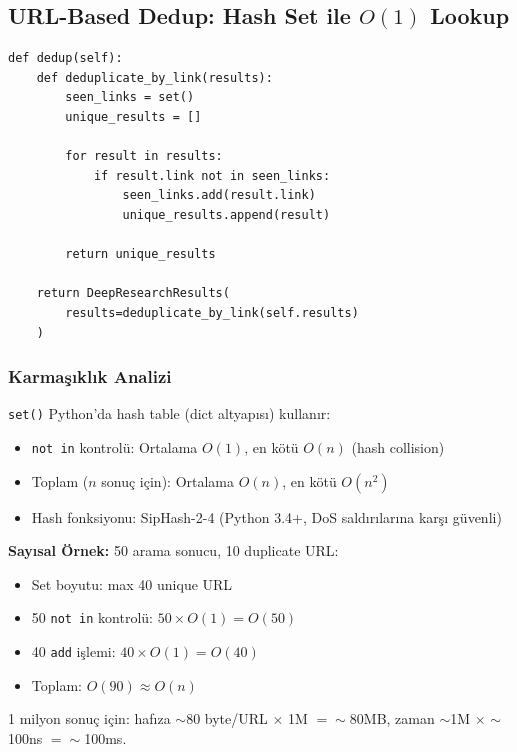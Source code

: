 \subsection{URL-Based Dedup: Hash Set ile $O(1)$ Lookup}
\label{subsec:url-dedup}

\begin{lstlisting}[caption={URL tabanl{\i} deduplication (data\_types.py)}, label={lst:dedup}]
def dedup(self):
    def deduplicate_by_link(results):
        seen_links = set()
        unique_results = []

        for result in results:
            if result.link not in seen_links:
                seen_links.add(result.link)
                unique_results.append(result)

        return unique_results

    return DeepResearchResults(
        results=deduplicate_by_link(self.results)
    )
\end{lstlisting}

\subsubsection{Karma\c{s}{\i}kl{\i}k Analizi}

\texttt{set()} Python'da hash table (dict altyap{\i}s{\i}) kullan{\i}r:
\begin{itemize}
  \item \texttt{not in} kontrol\"{u}: Ortalama $O(1)$, en k\"{o}t\"{u} $O(n)$ (hash collision)
  \item Toplam ($n$ sonu\c{c} i\c{c}in): Ortalama $O(n)$, en k\"{o}t\"{u} $O(n^2)$
  \item Hash fonksiyonu: SipHash-2-4 (Python 3.4+, DoS sald{\i}r{\i}lar{\i}na kar\c{s}{\i} g\"{u}venli)
\end{itemize}

\begin{ornek}
\textbf{Say{\i}sal \"{O}rnek:} 50 arama sonucu, 10 duplicate URL:
\begin{itemize}
  \item Set boyutu: max 40 unique URL
  \item 50 \texttt{not in} kontrol\"{u}: $50 \times O(1) = O(50)$
  \item 40 \texttt{add} i\c{s}lemi: $40 \times O(1) = O(40)$
  \item Toplam: $O(90) \approx O(n)$
\end{itemize}

1 milyon sonu\c{c} i\c{c}in: haf{\i}za $\sim$80 byte/URL $\times$ 1M $= \sim$80MB, zaman $\sim$1M $\times$ $\sim$100ns $= \sim$100ms.
\end{ornek}


